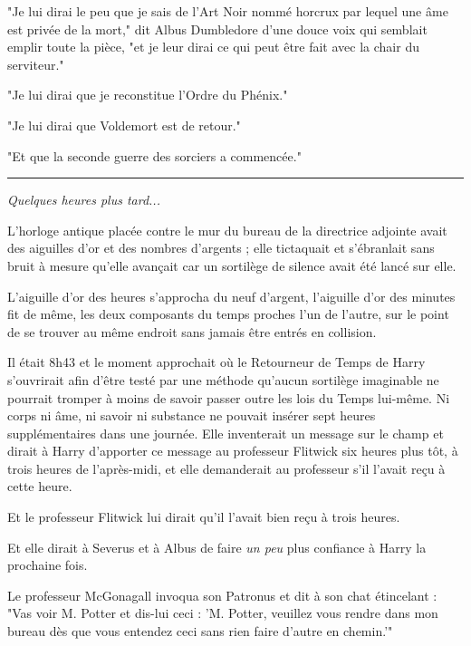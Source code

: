 "Je lui dirai le peu que je sais de l'Art Noir nommé horcrux par lequel une âme est privée de la mort," dit Albus Dumbledore d'une douce voix qui semblait emplir toute la pièce, "et je leur dirai ce qui peut être fait avec la chair du serviteur."

"Je lui dirai que je reconstitue l'Ordre du Phénix."

"Je lui dirai que Voldemort est de retour."

"Et que la seconde guerre des sorciers a commencée."
\par\noindent\rule{\textwidth}{0.4pt}
\emph{Quelques heures plus tard...} 

L'horloge antique placée contre le mur du bureau de la directrice adjointe avait des aiguilles d'or et des nombres d'argents ; elle tictaquait et s'ébranlait sans bruit à mesure qu'elle avançait car un sortilège de silence avait été lancé sur elle.

L'aiguille d'or des heures s'approcha du neuf d'argent, l'aiguille d'or des minutes fit de même, les deux composants du temps proches l'un de l'autre, sur le point de se trouver au même endroit sans jamais être entrés en collision.

Il était 8h43 et le moment approchait où le Retourneur de Temps de Harry s'ouvrirait afin d'être testé par une méthode qu'aucun sortilège imaginable ne pourrait tromper à moins de savoir passer outre les lois du Temps lui-même. Ni corps ni âme, ni savoir ni substance ne pouvait insérer sept heures supplémentaires dans une journée. Elle inventerait un message sur le champ et dirait à Harry d'apporter ce message au professeur Flitwick six heures plus tôt, à trois heures de l'après-midi, et elle demanderait au professeur s'il l'avait reçu à cette heure.

Et le professeur Flitwick lui dirait qu'il l'avait bien reçu à trois heures.

Et elle dirait à Severus et à Albus de faire \emph{un peu}  plus confiance à Harry la prochaine fois.

Le professeur McGonagall invoqua son Patronus et dit à son chat étincelant : "Vas voir M. Potter et dis-lui ceci : 'M. Potter, veuillez vous rendre dans mon bureau dès que vous entendez ceci sans rien faire d'autre en chemin.'"

